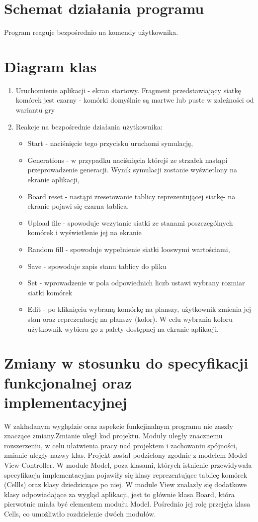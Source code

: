 \documentclass[10pt, oneside]{article}
\begin{document}
\section{Schemat działania programu}
Program reaguje bezpośrednio na komendy użytkownika. 

\section {Diagram klas}

\begin{enumerate}
\item Uruchomienie aplikacji - ekran startowy. Fragment przedstawiający siatkę komórek jest czarny -  komórki domyślnie są martwe lub puste w zależności od wariantu gry
\item Reakcje na bezpośrednie działania użytkownika:
	\begin {itemize}
	\item Start -  naciśnięcie tego przycisku uruchomi symulację, 
	\item Generations - w przypadku naciśnięcia którejś ze strzałek nastąpi przeprowadzenie generacji. Wynik symulacji zostanie wyświetlony na ekranie aplikacji,
	\item Board reset - nastąpi zresetowanie tablicy reprezentującej siatkę- na ekranie pojawi się czarna tablica.
	\item Upload file - spowoduje wczytanie siatki ze stanami poszczególnych komórek i wyświetlenie jej na ekranie
	\item Random fill -  spowoduje wypełnienie siatki looswymi wartościami,
	\item Save - spowoduje zapis stanu tablicy do pliku
	\item Set - wprowadzenie w pola odpowiednich liczb ustawi wybrany rozmiar siatki komórek
	\item Edit - po kliknięciu wybraną komórkę na  planszy, użytkownik zmienia jej stan oraz reprezentację na planszy (kolor). W celu wybrania koloru użytkownik wybiera go z palety dostępnej na ekranie aplikacji.
\end{itemize}
\end {enumerate}

\section {Zmiany w stosunku do specyfikacji funkcjonalnej oraz  implementacyjnej }
W zakładanym wyglądzie oraz  aspekcie funkcjinalnym programu nie zaszły znaczące zmiany.Zmianie uległ kod projektu. Moduły uległy znacznemu rozszerzeniu, w celu ułatwienia pracy nad projektem i zachowaniu spójności, zmianie uległy nazwy klas. Projekt został podzielony zgodnie z modelem Model-View-Controller. W module Model, poza klasami, których istnienie przewidywała specyfikacja implementacyjna pojawiły się klasy reprezentujące tablicę komórek (Cellls) oraz klasy dziedziczące po niej. W module View znalazły się dodatkowe klasy odpowiadające za wygląd aplikacji, jest to głównie klasa Board, która pierwotnie miała być elementem modułu Model. Pośrednio jej rolę przejęła klasa Cells, co umożliwiło rozdzielenie dwóch modułów.
\end{document}
